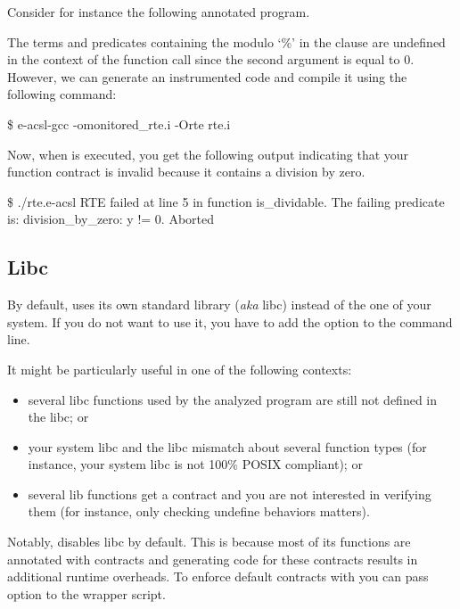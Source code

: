 Consider for instance the following annotated program.


The terms and predicates containing the modulo `\%' in the  clause
are undefined in the context of the  function call since the second
argument is equal to 0.  However, we can generate an instrumented code and
compile it using the following command:

\begin{logs}
\$ e-acsl-gcc -omonitored_rte.i -Orte rte.i
\end{logs}

Now, when  is executed, you get the following output indicating
that your function contract is invalid because it contains a division by zero.

\begin{logs}
\$ ./rte.e-acsl
RTE failed at line 5 in function is_dividable.
The failing predicate is:
division_by_zero: y != 0.
Aborted
\end{logs}


\subsection{Libc}

By default, \framac uses its own standard library (\emph{aka} libc) instead of
the one of your system. If you do not want to use it, you have to add the option
 to the \framac command
line.

It might be particularly useful in one of the following contexts:
\begin{itemize}
  \item several libc functions used by the analyzed program are still not defined
        in the \framac libc; or
  \item your system libc and the \framac libc mismatch about several function
        types (for instance, your system libc is not 100\% POSIX compliant); or
  \item several \framac lib functions get a contract and you are not interested in
        verifying them (for instance, only checking undefine behaviors matters).
\end{itemize}

\begin{important}
  Notably, \eacslgcc disables \framac libc by default. This is because most of
  its functions are annotated with \eacsl contracts and generating code for
  these contracts results in additional runtime overheads. To enforce default
  \framac contracts with \eacslgcc you can pass  option to the wrapper
  script.
\end{important}

